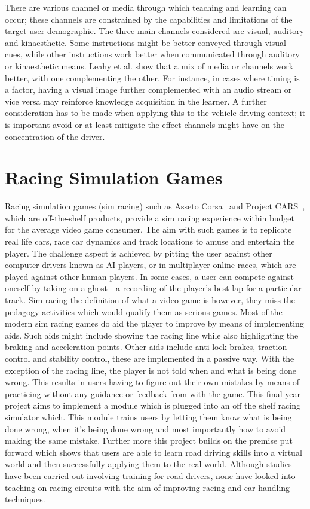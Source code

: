 There are various channel or media through which teaching and learning can occur; these channels are constrained by the capabilities and limitations of the target user demographic. The three main channels considered are visual, auditory and kinaesthetic. Some instructions might be better conveyed through visual cues, while other instructions work better when communicated through auditory or kinaesthetic means. Leahy et al. show that a mix of media or channels work better, with one complementing the other\cite{leahy2003auditory}. For instance, in cases where timing is a factor, having a visual image further complemented with an audio stream or vice versa may reinforce knowledge acquisition in the learner. A further consideration has to be made when applying this to the vehicle driving context; it is important avoid or at least mitigate the effect channels might have on the concentration of the driver\cite{engstrom2005effects}. 

\section{Racing Simulation Games}
Racing simulation games (sim racing) such as Asseto Corsa~\cite{assestoCorsa} and Project CARS~\cite{ProjectCars}, which are off-the-shelf products, provide a sim racing experience within budget for the average video game consumer. The aim with such games is to replicate real life cars, race car dynamics and track locations to amuse and entertain the player. The challenge aspect is achieved by pitting the user against other computer drivers known as AI players, or in multiplayer online races, which are played against other human players. In some cases, a user can compete against oneself by taking on a ghost - a recording of the player's best lap for a particular track. Sim racing the definition of what a video game is however, they miss the pedagogy activities which would qualify them as serious games. Most of the modern sim racing games do aid the player to improve by means of implementing aids. Such aids might include showing the racing line while also highlighting the braking and acceleration points. Other aids include anti-lock brakes, traction control and stability control, these are implemented in a passive way. With the exception of the racing line, the player is not told when and what is being done wrong. This results in users having to figure out their own mistakes by means of practicing without any guidance or feedback from with the game. This final year project aims to implement a module which is plugged into an off the shelf racing simulator which. This module trains users by letting them know what is being done wrong, when it's being done wrong and most importantly how to avoid making the same mistake. Further more this project builds on the premise put forward which shows that users are able to learn road driving skills into a virtual world and then successfully applying them to the real world\cite{li2015can, vogel2006computer}. Although studies have been carried out involving training for road drivers, none have looked into teaching on racing circuits with the aim of improving racing and car handling techniques.

